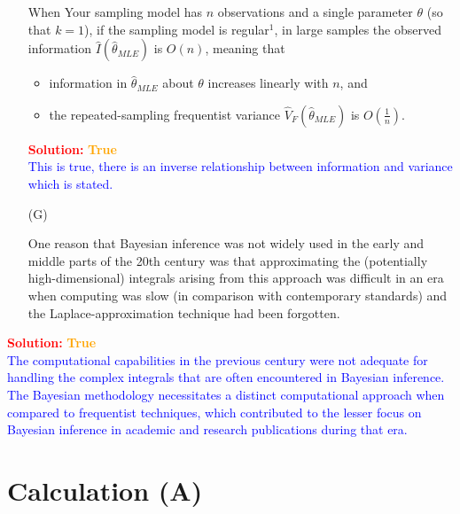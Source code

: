 \documentclass[12pt]{article}
\begin{document}
\begin{itemize}
When Your sampling model has $n$ observations and a single parameter $\theta$ (so that $k = 1$), if the sampling model is regular$^1$, in large samples the observed information $\hat{ I } \! \left( \hat{ \theta }_{ MLE } \right)$ is $O ( n )$, meaning that 
\begin{itemize}

\item

information in $\hat{ \theta }_{ MLE }$ about $\theta$ increases linearly with $n$, and

\item

the repeated-sampling frequentist variance $\hat{ V }_F \! \left( \hat{ \theta }_{ MLE } \right)$ is $O \! \left( \frac{ 1 }{ n } \right)$.

\end{itemize}

 \textcolor{red}{\textbf{Solution:}} \textbf{\textcolor{orange}{True}} \\
\textcolor{blue}{This is true, there is an inverse relationship between information and variance which is stated.}



\item[(G)]

One reason that Bayesian inference was not widely used in the early and middle parts of
the 20th century was that approximating the (potentially high-dimensional)
integrals arising from this approach was difficult in an era when computing
was slow (in comparison with contemporary standards) and the Laplace-approximation technique had been forgotten. 

\end{itemize}

 \textcolor{red}{\textbf{Solution:}} \textbf{\textcolor{orange}{True}} \\
\textcolor{blue}{The computational capabilities in the previous century were not adequate for handling the complex integrals that are often encountered in Bayesian inference. The Bayesian methodology necessitates a distinct computational approach when compared to frequentist techniques, which contributed to the lesser focus on Bayesian inference in academic and research publications during that era.}


\section{Calculation (A)}
\end{document}
